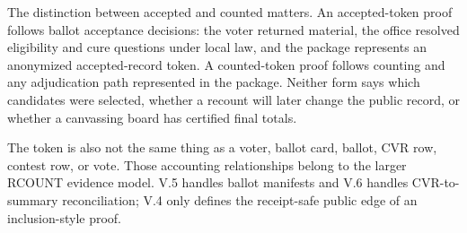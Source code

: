 The distinction between accepted and counted matters. An accepted-token proof
follows ballot acceptance decisions: the voter returned material, the office
resolved eligibility and cure questions under local law, and the package
represents an anonymized accepted-record token. A counted-token proof follows
counting and any adjudication path represented in the package. Neither form says
which candidates were selected, whether a recount will later change the public
record, or whether a canvassing board has certified final totals.

The token is also not the same thing as a voter, ballot card, ballot, CVR row,
contest row, or vote. Those accounting relationships belong to the larger
RCOUNT evidence model. V.5 handles ballot manifests and V.6 handles
CVR-to-summary reconciliation; V.4 only defines the receipt-safe public edge of
an inclusion-style proof.
